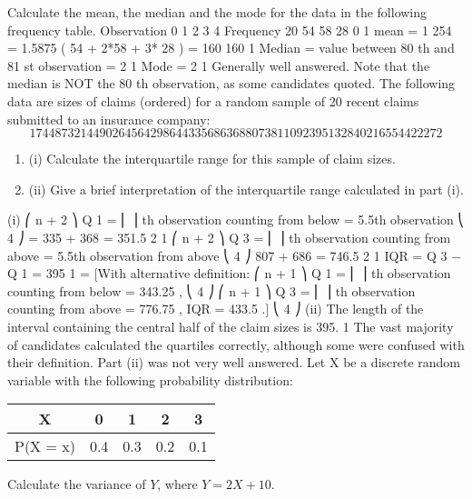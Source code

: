 \documentclass[a4paper,12pt]{article}
\begin{document}
Calculate the mean, the median and the mode for the data in the following frequency
table.
Observation 0 1 2 3 4
Frequency 20 54 58 28 0
\newpage
1
mean =
1
254
= 1.5875
( 54 + 2*58 + 3* 28 ) =
160
160
1
Median = value between 80 th and 81 st observation = 2 1
Mode = 2 1
Generally well answered. Note that the median is NOT the 80 th observation, as some
candidates quoted.
The following data are sizes of claims (ordered) for a random sample of 20 recent
claims submitted to an insurance company:
\[ 174
487
3
214
490
264
564
298
644
335
686
368
807
381
1092
395
1328
402
1655
442
2272\]
\begin{enumerate}
\item (i) Calculate the interquartile range for this sample of claim sizes.
\item (ii) Give a brief interpretation of the interquartile range calculated in part (i). 
\end{enumerate}




(i)
⎛ n + 2 ⎞
Q 1 = ⎜
⎟ th observation counting from below = 5.5th observation
⎝ 4 ⎠
=
335 + 368
= 351.5
2
1
⎛ n + 2 ⎞
Q 3 = ⎜
⎟ th observation counting from above = 5.5th observation from above
⎝ 4 ⎠
807 + 686
= 746.5
2 1
IQR = Q 3 − Q 1 = 395 1
=
[With alternative definition:
⎛ n + 1 ⎞
Q 1 = ⎜
⎟ th observation counting from below = 343.25 ,
⎝ 4 ⎠
⎛ n + 1 ⎞
Q 3 = ⎜
⎟ th observation counting from above = 776.75 , IQR = 433.5 .]
⎝ 4 ⎠
(ii)
The length of the interval containing the central half of the claim sizes is 395.
1
The vast majority of candidates calculated the quartiles correctly, although some were
confused with their definition. Part (ii) was not very well answered.
\newpage
Let X be a discrete random variable with the following probability distribution:

\begin{center}
\begin{tabular}{ccccc}
X & 0&1 & 2 & 3 \\ \hline
P(X = x)&0.4 & 0.3 & 0.2 & 0.1 \\ \hline
\end{tabular}
\end{center}
Calculate the variance of $Y$, where $Y = 2X + 10$.
\end{document}
